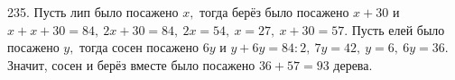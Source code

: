 235. Пусть лип было посажено $x,$ тогда берёз было посажено $x+30$ и $x+x+30=84,\ 2x+30=84,\ 2x=54,\ x=27,\ x+30=57.$ Пусть елей было посажено $y,$ тогда сосен посажено $6y$ и $y+6y=84:2,\ 7y=42,\ y=6,\ 6y=36.$ Значит, сосен и берёз вместе было посажено $36+57=93$ дерева.\\
